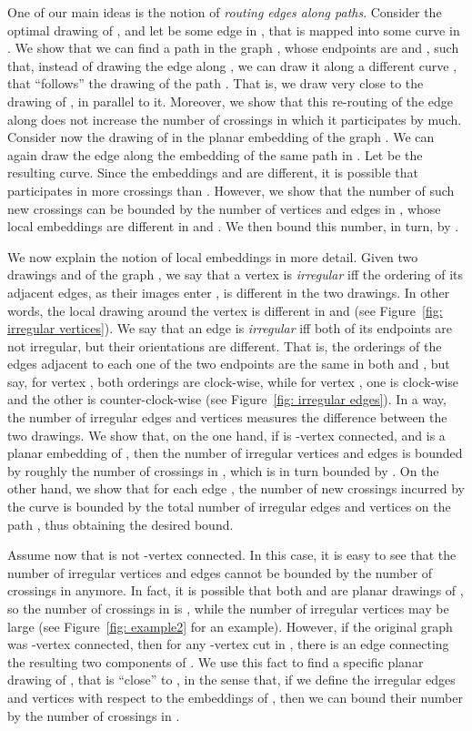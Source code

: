 \documentclass[twoside,leqno,twocolumn]{article}
\begin{document}
One of our main ideas is the notion of \emph{routing edges along paths}. Consider the optimal drawing  of , and let  be some
edge in , that is mapped into some curve  in . We show that we can find a path  in the graph , whose endpoints are  and , such that, instead of drawing the edge  along , we can draw it along a different curve , that ``follows'' the drawing of the path . That is, we draw  very close to the drawing of , in parallel to it. Moreover, we show that this re-routing of the edge  along  does not increase the number of crossings in which it participates by much. Consider now the drawing of  in the planar embedding  of the graph . We can again draw the edge  along the embedding of the same path  in . Let  be the resulting curve. Since the embeddings  and  are different, it is possible that  participates in more crossings than . However, we show that the number of such new crossings can be bounded by the number of vertices and edges in , whose local embeddings are different in  and . We then bound this number, in turn, by .

We now explain the notion of local embeddings in more detail. Given two drawings  and  of the graph , we say that a vertex  is \emph{irregular} iff the ordering of its adjacent edges, as their images enter , is different in the two drawings. In other words, the local drawing around the vertex  is different in  and  (see Figure~\ref{fig: irregular vertices}). We say that an edge  is \emph{irregular} iff both of its endpoints are not irregular, but their orientations are different. That is, the orderings of the edges adjacent to each one of the two endpoints are the same in both  and , but say, for vertex , both orderings are clock-wise, while for vertex , one is clock-wise and the other is counter-clock-wise (see Figure~\ref{fig: irregular edges}). In a way, the number of irregular edges and vertices measures the difference between the two drawings. We show that, on the one hand, if  is -vertex connected, and  is a planar embedding of , then the number of irregular vertices and edges is bounded by roughly the number of crossings in , which is in turn bounded by . On the other hand, we show that for each edge , the number of new crossings incurred by the curve  is bounded by the total number of irregular edges and vertices on the path , thus obtaining the desired bound.

Assume now that  is not -vertex connected. In this case, it is easy to see that the number of irregular vertices and edges cannot be bounded by the number of crossings in  anymore. In fact, it is possible that both  and  are planar drawings of , so the number of crossings in  is , while the number of irregular vertices may be large (see Figure~\ref{fig: example2} for an example). However, if the original graph  was -vertex connected, then for any -vertex cut  in , there is an edge  connecting the resulting two components of . We use this fact to find a specific planar drawing  of , that is ``close'' to , in the sense that, if we define the irregular edges and vertices with respect to the embeddings  of , then we can bound their number  by the number of crossings in .
\end{document}
